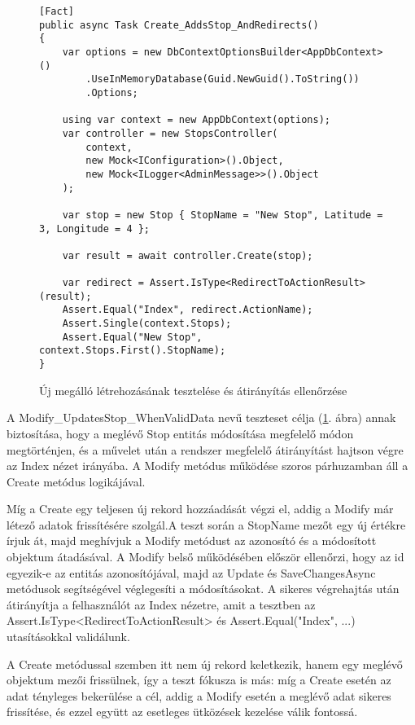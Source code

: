 \begin{figure}[H]
\caption{Új megálló létrehozásának tesztelése és átirányítás ellenőrzése}
\label{fig:create-stop-test-method}
\begin{minipage}{\textwidth}
\begin{BVerbatim}
[Fact]
public async Task Create_AddsStop_AndRedirects()
{
    var options = new DbContextOptionsBuilder<AppDbContext>()
        .UseInMemoryDatabase(Guid.NewGuid().ToString())
        .Options;

    using var context = new AppDbContext(options);
    var controller = new StopsController(
        context,
        new Mock<IConfiguration>().Object,
        new Mock<ILogger<AdminMessage>>().Object
    );

    var stop = new Stop { StopName = "New Stop", Latitude = 3, Longitude = 4 };

    var result = await controller.Create(stop);

    var redirect = Assert.IsType<RedirectToActionResult>(result);
    Assert.Equal("Index", redirect.ActionName);
    Assert.Single(context.Stops);
    Assert.Equal("New Stop", context.Stops.First().StopName);
}
\end{BVerbatim}
\end{minipage}
\end{figure}

A Modify\_UpdatesStop\_WhenValidData nevű teszteset célja (\ref{fig:create-stop-test-method}. ábra) annak biztosítása, hogy a meglévő Stop entitás módosítása megfelelő módon megtörténjen, és a művelet után a rendszer megfelelő átirányítást hajtson végre az Index nézet irányába. A Modify metódus működése szoros párhuzamban áll a Create metódus logikájával.

Míg a Create egy teljesen új rekord hozzáadását végzi el, addig a Modify már létező adatok frissítésére szolgál.A teszt során a StopName mezőt egy új értékre írjuk át, majd meghívjuk a Modify metódust az azonosító és a módosított objektum átadásával. A Modify belső működésében először ellenőrzi, hogy az id egyezik-e az entitás azonosítójával, majd az Update és SaveChangesAsync metódusok segítségével véglegesíti a módosításokat. A sikeres végrehajtás után átirányítja a felhasználót az Index nézetre, amit a tesztben az Assert.IsType<RedirectToActionResult> és Assert.Equal("Index", ...) utasításokkal validálunk.

A Create metódussal szemben itt nem új rekord keletkezik, hanem egy meglévő objektum mezői frissülnek, így a teszt fókusza is más: míg a Create esetén az adat tényleges bekerülése a cél, addig a Modify esetén a meglévő adat sikeres frissítése, és ezzel együtt az esetleges ütközések kezelése válik fontossá.



